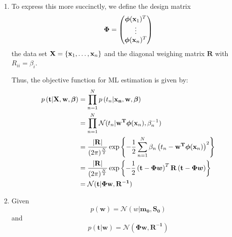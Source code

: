 \documentclass[reqno]{amsart}
\begin{document}
\begin{enumerate}[label=\textbf{(\Roman*)}]
        \solution
        \begin{enumerate}[label=\textbf{(\alph*)}]
            \item To express this more succinctly, we define the design matrix \[\boldsymbol{\Phi} = \begin{pmatrix}\boldsymbol{\phi}(\mathbf{x}_1)^T \\ \vdots \\ \boldsymbol{\phi}(\mathbf{x}_n)^T\end{pmatrix} \]
            the data set \(\mathbf{X} = \left\{\mathbf{x}_1, \ldots, \mathbf{x}_{n}\right\}\)
            and the diagonal weighing matrix \(\mathbf{R}\) with \(R_{ii} = \beta_i\).
            
            Thus, the objective function for ML estimation is given by:
            \begin{align}
                \begin{split}
                    p\left({\mathbf{t}} \middle| {\mathbf{X}, \mathbf{w}, \boldsymbol{\beta}}\right)  
                    &= \prod_{n = 1}^{N} p\left(t_n | \mathbf{x_n}, \mathbf{w}, \boldsymbol{\beta}\right) \\
                    &= \prod_{n = 1}^{N} \mathcal{N} (t_n | \mathbf{w^T} \boldsymbol{\phi}(\mathbf{x}_n), \beta_n^{-1}) \\
                    &= \frac{\left|\mathbf{R}\right|}{(2\pi)^{\frac{N}{2}}}\exp \left\{- \frac{1}{2} \sum_{n = 1}^{N} \beta_n \left(t_n - \mathbf{w^T} \boldsymbol{\phi}(\mathbf{x}_n)\right)^2\right\} \\
                    &= \frac{\left|\mathbf{R}\right|}{(2\pi)^{\frac{N}{2}}}\exp \left\{- \frac{1}{2} \left(\mathbf{t} - \boldsymbol{\Phi w}\right)^T \mathbf{R} \left(\mathbf{t} - \boldsymbol{\Phi w}\right)\right\} \\
                    &= \mathcal{N} (\mathbf{t}|\mathbf{\Phi w, R^{-1}}) \label{eq:ml} 
                \end{split}
            \end{align}
            \item 
                Given
                    \[p(\mathbf{w}) = \mathcal{N}(w|\mathbf{m_0, S_0})\]
                and
                    \[p(\mathbf{t|w}) = \mathcal{N}(\mathbf{\Phi w, R^{-1}})\]


\end{enumerate}
\end{enumerate}
\end{document}
